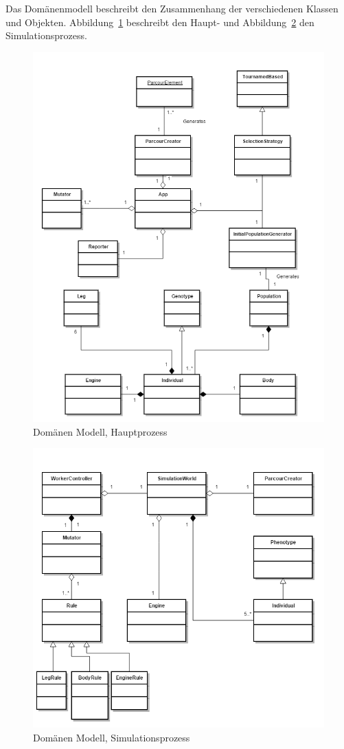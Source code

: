       Das Domänenmodell beschreibt den Zusammenhang der verschiedenen Klassen und Objekten.
      Abbildung~\ref{fig:mainProcess} beschreibt den Haupt- und Abbildung~\ref{fig:simulationProcess} den Simulationsprozess.
      \begin{figure}[H]
        \includegraphics[scale=0.6,center]{graphics/main_process}
        \caption{Domänen Modell, Hauptprozess\label{fig:mainProcess}}
      \end{figure}
      \begin{figure}[H]
        \includegraphics[scale=0.6,center]{graphics/simulation_process}
        \caption{Domänen Modell, Simulationsprozess\label{fig:simulationProcess}}
      \end{figure}
